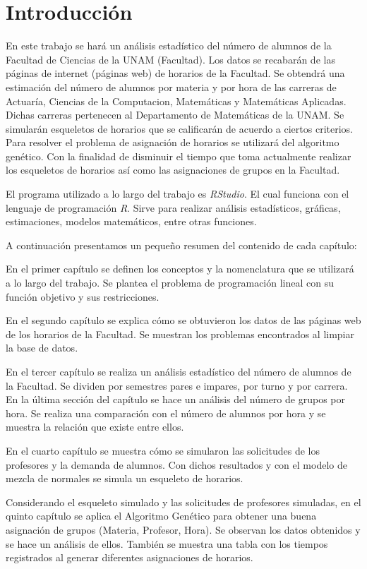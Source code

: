 \chapter*{Introducción}


En este trabajo se hará un análisis estadístico del número de alumnos de la Facultad de Ciencias de la UNAM (Facultad). Los datos se recabarán de las páginas de internet (páginas web) de horarios de la Facultad. Se obtendrá una estimación del número de alumnos por materia y por hora de las carreras de Actuaría, Ciencias de la Computacion, Matemáticas y Matemáticas Aplicadas. Dichas carreras pertenecen al Departamento de Matemáticas de la UNAM. Se simularán esqueletos de horarios que se calificarán de acuerdo a ciertos criterios. Para resolver el problema de asignación de horarios se utilizará del algoritmo genético. Con la finalidad de disminuir el tiempo que toma actualmente realizar los esqueletos de horarios así como las asignaciones de grupos en la Facultad.

El programa utilizado a lo largo del trabajo es \textit{RStudio}. El cual funciona con el lenguaje de programación \textit{R}. Sirve para realizar análisis estadísticos, gráficas, estimaciones, modelos matemáticos, entre otras funciones.

A continuación presentamos un pequeño resumen del contenido de cada capítulo:

En el primer capítulo se definen los conceptos y la nomenclatura que se utilizará a lo largo del trabajo. Se plantea el problema de programación lineal con su función objetivo y sus restricciones.

En el segundo capítulo se explica cómo se obtuvieron los datos de las páginas web de los horarios de la Facultad. Se muestran los problemas encontrados al limpiar la base de datos.

En el tercer capítulo se realiza un análisis estadístico del número de alumnos de la Facultad. Se dividen por semestres pares e impares, por turno y por carrera. En la última sección del capítulo se hace un análisis del número de grupos por hora. Se realiza una comparación con el número de alumnos por hora y se muestra la relación que existe entre ellos.

En el cuarto capítulo se muestra cómo se simularon las solicitudes de los profesores y la demanda de alumnos. Con dichos resultados y con el modelo de mezcla de normales se simula un esqueleto de horarios.

Considerando el esqueleto simulado y las solicitudes de profesores simuladas, en el quinto capítulo se aplica el Algoritmo Genético para obtener una buena asignación de grupos (Materia, Profesor, Hora). Se observan los datos obtenidos y se hace un análisis de ellos. También se muestra una tabla con los tiempos registrados al generar diferentes asignaciones de horarios.








